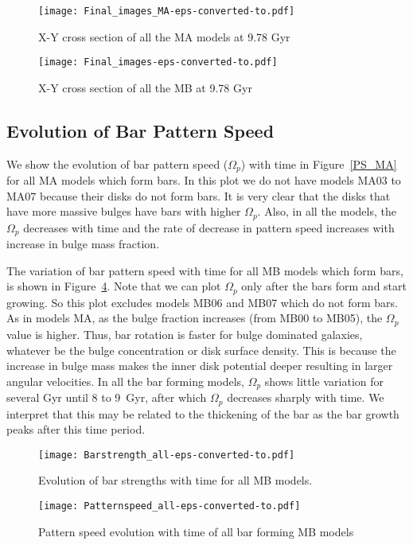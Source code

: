 \documentclass[a4paper,fleqn,usenatbib,useAMS]{mnras}
\begin{document}
\begin{figure}
\texttt{[image: Final\_images\_MA-eps-converted-to.pdf]}
\caption{X-Y cross section of all the MA models at 9.78 Gyr  }\label{fig MA}
\end{figure}

\begin{figure}
\texttt{[image: Final\_images-eps-converted-to.pdf]}
\caption{X-Y cross section of all the MB at 9.78 Gyr  }\label{fig MB}
\end{figure}

\subsection{Evolution of Bar Pattern Speed}
We show the evolution of bar pattern speed ($\Omega_p$) with time in Figure~\ref{PS_MA} for all MA models which form bars. In this plot we do not have models MA03 to MA07 because their disks do not form bars. It is very clear that the disks that have more massive bulges have bars with higher $\Omega_p$. Also, in all the models, the $\Omega_p$ decreases with time and the rate of decrease in pattern speed increases with increase in bulge mass fraction.

The variation of bar pattern speed with time for all MB models which form bars, is shown in Figure~\ref{PS_MB}. Note that we can plot $\Omega_p$ only after the bars form and start growing. So this plot excludes models MB06 and MB07 which do not form bars. As in models MA, as the bulge fraction increases (from MB00 to MB05), the $\Omega_p$ value is higher. Thus, bar rotation is faster for bulge dominated galaxies, whatever be the bulge concentration or disk surface density. This is because the increase in bulge mass makes the inner disk potential deeper resulting in larger angular velocities. In all the bar forming models, $\Omega_p$ shows little variation for several Gyr until 8 to 9~Gyr, after which $\Omega_p$ decreases sharply with time. We interpret that this may be related to the thickening  of the bar as the bar growth peaks after this time period.


\begin{figure}
\texttt{[image: Barstrength\_all-eps-converted-to.pdf]}
\caption{Evolution of bar strengths with time for all MB models.}
\label{figure:BS_MB}
\end{figure}

\begin{figure}
\texttt{[image: Patternspeed\_all-eps-converted-to.pdf]}
\caption{Pattern speed evolution with time  of all bar forming MB models }\label{PS_MB}
\end{figure}
\end{document}
